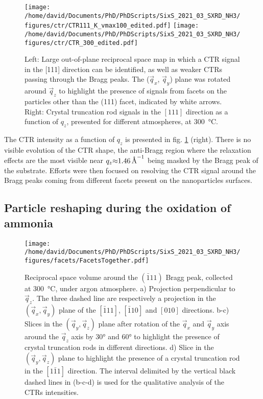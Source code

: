 \begin{figure}[!htb]
    \centering
    \texttt{[image: /home/david/Documents/PhD/PhDScripts/SixS\_2021\_03\_SXRD\_NH3/figures/ctr/CTR111\_K\_vmax100\_edited.pdf]}
    \texttt{[image: /home/david/Documents/PhD/PhDScripts/SixS\_2021\_03\_SXRD\_NH3/figures/ctr/CTR\_300\_edited.pdf]}
    \caption{
        Left: Large out-of-plane reciprocal space map in which a CTR signal in the [111] direction can be identified, as well as weaker CTRs passing through the Bragg peaks.
        The ($\vec{q}_x$, $\vec{q}_y$) plane was rotated around $\vec{q}_z$ to highlight the presence of signals from facets on the particles other than the (111) facet, indicated by white arrows.
        Right: Crystal truncation rod signals in the $[111]$ direction as a function of $q_z$, presented for different atmospheres, at \qty{300}{\degreeCelsius}.
    }
    \label{fig:2DCTR111Particles}
\end{figure}

The CTR intensity as a function of $q_z$ is presented in fig. \ref{fig:2DCTR111Particles} (right).
There is no visible evolution of the CTR shape, the anti-Bragg region where the relaxation effects are the most visible near $q_z \qty{\approx1.46}{\per\angstrom}$ being masked by the Bragg peak of the substrate.
Efforts were then focused on resolving the CTR signal around the Bragg peaks coming from different facets present on the nanoparticles surfaces.

\subsection{Particle reshaping during the oxidation of ammonia}

\begin{figure}[!htb]
    \centering
    \texttt{[image: /home/david/Documents/PhD/PhDScripts/SixS\_2021\_03\_SXRD\_NH3/figures/facets/FacetsTogether.pdf]}
    \caption{
        Reciprocal space volume around the $(\bar{1}11)$ Bragg peak, collected at \qty{300}{\degreeCelsius}, under argon atmosphere.
        a) Projection perpendicular to $\vec{q}_z$.
        The three dashed line are respectively a projection in the $(\vec{q}_x, \vec{q}_y)$ plane of the $[\bar{1}11]$, $[\bar{1}10]$ and $[010]$ directions.
        b-c) Slices in the $(\vec{q}_y, \vec{q}_z)$ plane after rotation of the $\vec{q}_x$ and $\vec{q}_y$ axis around the $\vec{q}_z$ axis by \ang{30} and \ang{60} to highlight the presence of crystal truncation rods in different directions.
        d) Slice in the $(\vec{q}_y, \vec{q}_z)$ plane to highlight the presence of a crystal truncation rod in the $[1\bar{1}1]$ direction.
        The interval delimited by the vertical black dashed lines in (b-c-d) is used for the qualitative analysis of the CTRs intensities.
    }
    \label{fig:FacetMaps}
\end{figure}

